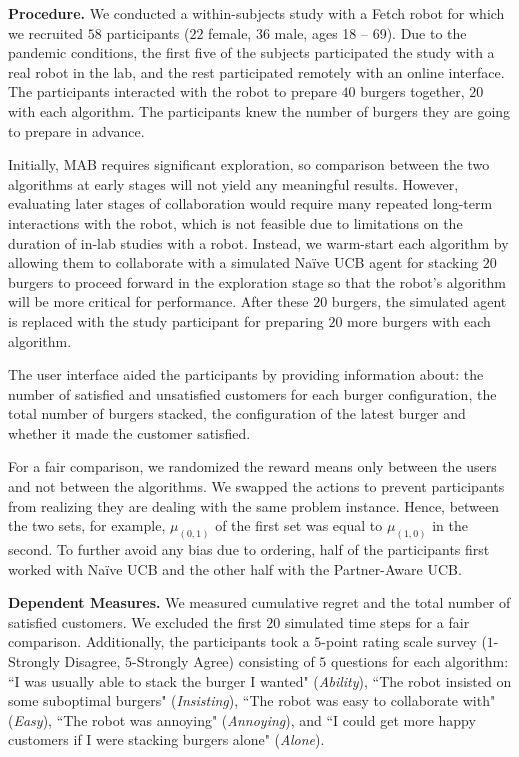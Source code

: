 \documentclass[letterpaper]{article} %
\theoremstyle{definition}
\begin{document}
\smallskip
\noindent\textbf{Procedure.} We conducted a within-subjects study with a Fetch robot \cite{wise2016fetch} for which we recruited $58$ participants ($22$ female, $36$ male, ages 18 -- 69).
Due to the pandemic conditions, the first five of the subjects participated the study with a real robot in the lab, and the rest participated remotely with an online interface.
The participants interacted with the robot to prepare $40$ burgers together, $20$ with each algorithm. The participants knew the number of burgers they are going to prepare in advance.

Initially, MAB requires significant exploration, so comparison between the two algorithms at early stages will not yield any meaningful results. However, evaluating later stages of collaboration would require many repeated long-term interactions with the robot, which is not feasible due to limitations on the duration of in-lab studies with a robot. Instead, we warm-start each algorithm by allowing them to collaborate with a simulated Na\"ive UCB agent for stacking $20$ burgers to proceed forward in the exploration stage so that the robot's algorithm will be more critical for performance. After these $20$ burgers, the simulated agent is replaced with the study participant for preparing $20$ more burgers with each algorithm.

The user interface aided the participants by providing information about: the number of satisfied and unsatisfied customers for each burger configuration, the total number of burgers stacked, the configuration of the latest burger and whether it made the customer satisfied.

For a fair comparison, we randomized the reward means only between the users and not between the algorithms.
We swapped the actions to prevent participants from realizing they are dealing with the same problem instance. Hence, between the two sets, for example, $\mu_{(0,1)}$ of the first set was equal to $\mu_{(1,0)}$ in the second.
To further avoid any bias due to ordering, half of the participants first worked with Na\"ive UCB and the other half with the Partner-Aware UCB.

\smallskip
\noindent\textbf{Dependent Measures.}
We measured cumulative regret and the total number of satisfied customers. We excluded the first $20$ simulated time steps for a fair comparison. Additionally, the participants took a $5$-point rating scale survey ($1$-Strongly Disagree, $5$-Strongly Agree) consisting of $5$ questions for each algorithm: ``I was usually able to stack the burger I wanted" (\emph{Ability}), ``The robot insisted on some suboptimal burgers" (\emph{Insisting}), ``The robot was easy to collaborate with" (\emph{Easy}), ``The robot was annoying" (\emph{Annoying}), and ``I could get more happy customers if I were stacking burgers alone" (\emph{Alone}).
\end{document}
